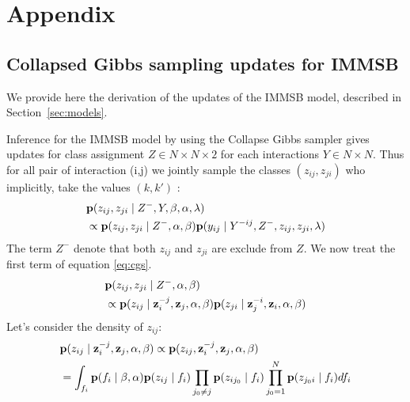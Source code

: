 \section{Appendix}
\label{sec:append}

\subsection{Collapsed Gibbs sampling updates for IMMSB}

We provide here the derivation of the updates of the IMMSB model, described in Section~\ref{sec:models}.




Inference for the IMMSB model by using the Collapse Gibbs sampler gives updates for class assignment $Z \in N\times N \times 2$ for each interactions $Y \in N\times N$. Thus for all pair of interaction (i,j) we jointly sample the classes $(z_{ij}, z_{ji})$ who implicitly, take the values $(k,k')$ :
\begin{align} \label{eq:cgs}
&\pr(z_{ij}, z_{ji} \mid Z^-, Y,  \mat{\beta}, \alpha, \mat{\lambda} )  \\
&\propto\pr(z_{ij}, z_{ji} \mid Z^-, \alpha,\mat{\beta}) \pr(y_{ij} \mid Y^{-ij},  Z^-,z_{ij}, z_{ji},  \mat{\lambda} ) \nonumber
\end{align}
The term $Z^-$ denote that both $z_{ij}$ and $z_{ji}$ are exclude from $Z$. We now treat the first term of equation \ref{eq:cgs}.  
\begin{align}
& \mathbf{p}(z_{ij}, z_{ji} \mid Z^-, \alpha,\mathbf{\beta})\\
&\propto \mathbf{p}(z_{ij} \mid \mathbf{z}_i^{-j}, \mathbf{z}_j, \alpha,\mathbf{\beta})  \mathbf{p}(z_{ji} \mid \mathbf{z}_j^{-i}, \mathbf{z}_i, \alpha,\mathbf{\beta}) \nonumber
\end{align}
Let's consider the density of $z_{ij}$:
\begin{align}
&\mathbf{p}(z_{ij} \mid \mathbf{z}_i^{-j}, \mathbf{z}_j, \alpha,\mathbf{\beta}) \propto \mathbf{p}(z_{ij},  \mathbf{z}_i^{-j}, \mathbf{z}_j, \alpha,\mathbf{\beta}) \\
&= \int_{f_i} \mathbf{p}(f_i \mid \mathbf{\beta}, \alpha) \mathbf{p}(z_{ij} \mid f_i) \prod_{j_0\neq j} \mathbf{p}(z_{ij_0} \mid f_i) \prod_{j_0 =  1}^N  \mathbf{p}(z_{j_0 i} \mid f_i)  df_i \nonumber
\end{align}


